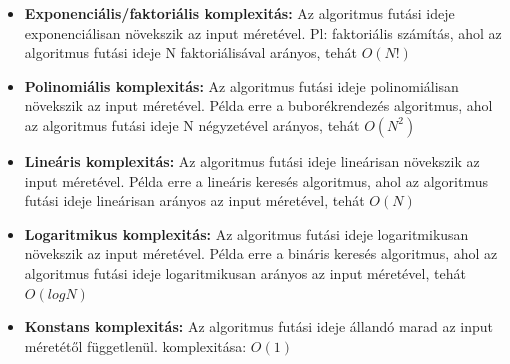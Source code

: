 \documentclass[12pt,a4paper]{article}
\begin{document}
            \begin{tcolorbox}[colback=blue!5!white,colframe=blue!50!black,title= 5. Ismertesse az algoritmusok komplexitásának meghatározását! Mondjon példát gyakori komplexitás típusokra!]
                \begin{itemize}
                    \item \textbf{Exponenciális/faktoriális komplexitás:} Az algoritmus futási ideje exponenciálisan növekszik az input méretével. Pl: faktoriális számítás, ahol az algoritmus futási ideje N faktoriálisával arányos, tehát \(O(N!)\)
                    \item \textbf{Polinomiális komplexitás:} Az algoritmus futási ideje polinomiálisan növekszik az input méretével. Példa erre a buborékrendezés algoritmus, ahol az algoritmus futási ideje N négyzetével arányos, tehát \(O(N^2)\)
                    \item \textbf{Lineáris komplexitás:} Az algoritmus futási ideje lineárisan növekszik az input méretével. Példa erre a lineáris keresés algoritmus, ahol az algoritmus futási ideje lineárisan arányos az input méretével, tehát \(O(N)\)
                    \item \textbf{Logaritmikus komplexitás:} Az algoritmus futási ideje logaritmikusan növekszik az input méretével. Példa erre a bináris keresés algoritmus, ahol az algoritmus futási ideje logaritmikusan arányos az input méretével, tehát \(O(log N)\)
                    \item \textbf{Konstans komplexitás:} Az algoritmus futási ideje állandó marad az input méretétől függetlenül. komplexitása: \(O(1)\)
                \end{itemize}
                \begin{center}
                \end{center}
            \end{tcolorbox}
\end{document}
